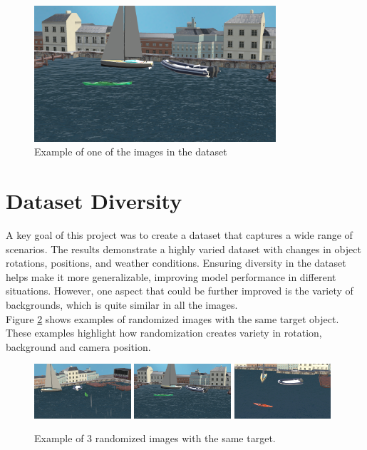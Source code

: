 \begin{figure}[H]
\centering
\includegraphics[width=0.8\textwidth]{Figures/results/rand2.png}
\caption{Example of one of the images in the dataset}
\label{fig:original_image}
\end{figure}

\section{Dataset Diversity}
A key goal of this project was to create a dataset that captures a wide range of scenarios. The results demonstrate a highly varied dataset with changes in object rotations, positions, and weather conditions. Ensuring diversity in the dataset helps make it more generalizable, improving model performance in different situations. However, one aspect that could be further improved is the variety of backgrounds, which is quite similar in all the images. \\

\noindent Figure \ref{fig:randomized_images} shows examples of randomized images with the same target object. These examples highlight how randomization creates variety in rotation, background and camera position.

\begin{figure}[H]
\centering
\includegraphics[width=0.32\textwidth]{Figures/results/rand1.png}
\includegraphics[width=0.32\textwidth]{Figures/results/rand2.png}
\includegraphics[width=0.32\textwidth]{Figures/results/rand3.png}
\caption{Example of 3 randomized images with the same target.}
\label{fig:randomized_images}
\end{figure}

